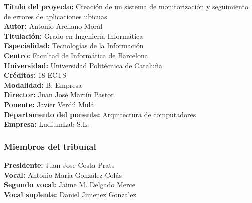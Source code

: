 \textbf{Título del proyecto:} Creación de un sistema de monitorización y seguimiento de errores de aplicaciones ubicuas \\
\textbf{Autor:} Antonio Arellano Moral \\
\textbf{Titulación:} Grado en Ingeniería Informática \\
\textbf{Especialidad:} Tecnologías de la Información \\
\textbf{Centro:} Facultad de Informática de Barcelona \\
\textbf{Universidad:} Universidad Politécnica de Cataluña \\
\textbf{Créditos:} 18 ECTS \\
\textbf{Modalidad:} B: Empresa \\
\textbf{Director:} Juan José Martín Pastor \\
\textbf{Ponente:} Javier Verdú Mulá \\
\textbf{Departamento del ponente:} Arquitectura de computadores \\
\textbf{Empresa:} LudiumLab S.L. \\

\begin{center}
	\subsubsection{Miembros del tribunal}
\end{center}

\textbf{Presidente:} Juan Jose Costa Prats \\
\textbf{Vocal:} Antonio Maria González Colás \\
\textbf{Segundo vocal:} Jaime M. Delgado Merce \\
\textbf{Vocal suplente:} Daniel Jimenez Gonzalez \\

